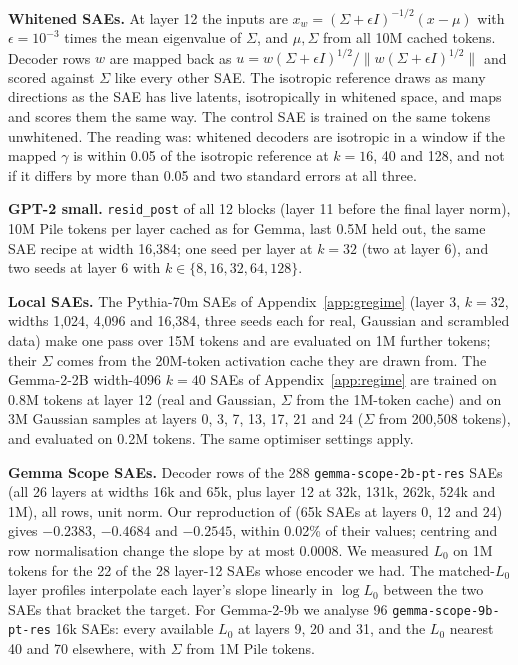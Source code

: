 \documentclass{article}
\newcommand{\Sig}{\Sigma}
\newcommand{\Lz}{L_0}
\begin{document}
\textbf{Whitened SAEs.} At layer 12 the inputs are $x_w = (\Sig+\epsilon I)^{-1/2}(x-\mu)$ with $\epsilon = 10^{-3}$ times the mean eigenvalue of $\Sig$, and $\mu,\Sig$ from all 10M cached tokens. Decoder rows $w$ are mapped back as $u = w(\Sig+\epsilon I)^{1/2}/\|w(\Sig+\epsilon I)^{1/2}\|$ and scored against $\Sig$ like every other SAE. The isotropic reference draws as many directions as the SAE has live latents, isotropically in whitened space, and maps and scores them the same way. The control SAE is trained on the same tokens unwhitened. The reading was: whitened decoders are isotropic in a window if the mapped $\gamma$ is within 0.05 of the isotropic reference at $k=16$, 40 and 128, and not if it differs by more than 0.05 and two standard errors at all three.

\textbf{GPT-2 small.} \texttt{resid\_post} of all 12 blocks (layer 11 before the final layer norm), 10M Pile tokens per layer cached as for Gemma, last 0.5M held out, the same SAE recipe at width 16,384; one seed per layer at $k=32$ (two at layer 6), and two seeds at layer 6 with $k \in \{8,16,32,64,128\}$.

\textbf{Local SAEs.} The Pythia-70m SAEs of Appendix~\ref{app:gregime} (layer 3, $k=32$, widths 1,024, 4,096 and 16,384, three seeds each for real, Gaussian and scrambled data) make one pass over 15M tokens and are evaluated on 1M further tokens; their $\Sig$ comes from the 20M-token activation cache they are drawn from. The Gemma-2-2B width-4096 $k=40$ SAEs of Appendix~\ref{app:regime} are trained on 0.8M tokens at layer 12 (real and Gaussian, $\Sig$ from the 1M-token cache) and on 3M Gaussian samples at layers 0, 3, 7, 13, 17, 21 and 24 ($\Sig$ from 200,508 tokens), and evaluated on 0.2M tokens. The same optimiser settings apply.

\textbf{Gemma Scope SAEs.} Decoder rows of the 288 \texttt{gemma-scope-2b-pt-res} SAEs (all 26 layers at widths 16k and 65k, plus layer 12 at 32k, 131k, 262k, 524k and 1M), all rows, unit norm. Our reproduction of \citet{li2025geometry} (65k SAEs at layers 0, 12 and 24) gives $-0.2383$, $-0.4684$ and $-0.2545$, within 0.02\% of their values; centring and row normalisation change the slope by at most 0.0008. We measured $\Lz$ on 1M tokens for the 22 of the 28 layer-12 SAEs whose encoder we had. The matched-$\Lz$ layer profiles interpolate each layer's slope linearly in $\log \Lz$ between the two SAEs that bracket the target. For Gemma-2-9b we analyse 96 \texttt{gemma-scope-9b-pt-res} 16k SAEs: every available $\Lz$ at layers 9, 20 and 31, and the $\Lz$ nearest 40 and 70 elsewhere, with $\Sig$ from 1M Pile tokens.
\end{document}
